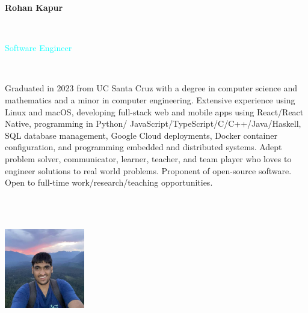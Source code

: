 \documentclass[letterpaper,10pt]{article}
\begin{document}
\fontsize{9pt}{\baselineskip}\selectfont

\begin{multicols}{3}
  \begin{huge} \noindent\textbf{Rohan Kapur} \end{huge} \\
  \begin{Large} \textcolor{cyan}{Software Engineer} \end{Large}
  \vspace{.5em} \\
  \begin{minipage}{.5\textwidth}
    \begin{flushleft}
      Graduated in 2023 from UC Santa Cruz with a degree in computer science and mathematics and a minor in computer engineering. Extensive experience using Linux and macOS, developing full-stack web and mobile apps using React/React Native, programming in Python/
      JavaScript/TypeScript/C/C++/Java/Haskell, SQL database management, Google Cloud deployments, Docker container configuration, and programming embedded and distributed systems. Adept problem solver, communicator, learner, teacher, and team player who loves to engineer solutions to real world problems. Proponent of open-source software. Open to full-time work/research/teaching opportunities.
    \end{flushleft}
  \end{minipage}
  \columnbreak \\
  \vspace{3em} \\
  \begin{minipage}{.33\textwidth}
    \hspace{11.6em}
    \includegraphics*[width=3.5cm,height=3.5cm]{images/ProfilePicture.jpg}
  \end{minipage}
  \columnbreak \\
  \vspace{3em} \\
  \begin{minipage}{.33\textwidth}
    \begin{flushright}

\end{flushright}
\end{minipage}
\end{multicols}
\end{document}
